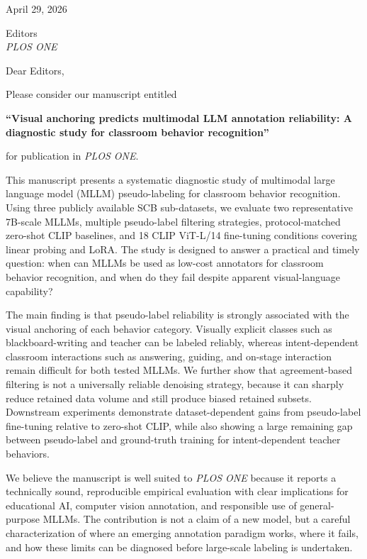 \documentclass[11pt]{article}
\begin{document}
\begin{flushright}
April 29, 2026
\end{flushright}

Editors \\
\textit{PLOS ONE}

Dear Editors,

Please consider our manuscript entitled

\textbf{``Visual anchoring predicts multimodal LLM annotation reliability: A diagnostic study for classroom behavior recognition''}

for publication in \textit{PLOS ONE}.

This manuscript presents a systematic diagnostic study of multimodal large
language model (MLLM) pseudo-labeling for classroom behavior recognition. Using
three publicly available SCB sub-datasets, we evaluate two representative
7B-scale MLLMs, multiple pseudo-label filtering strategies, protocol-matched
zero-shot CLIP baselines, and 18 CLIP ViT-L/14 fine-tuning conditions covering
linear probing and LoRA. The study is designed to answer a practical and timely
question: when can MLLMs be used as low-cost annotators for classroom behavior
recognition, and when do they fail despite apparent visual-language capability?

The main finding is that pseudo-label reliability is strongly associated with
the visual anchoring of each behavior category. Visually explicit classes such
as blackboard-writing and teacher can be labeled reliably, whereas
intent-dependent classroom interactions such as answering, guiding, and
on-stage interaction remain difficult for both tested MLLMs. We further show
that agreement-based filtering is not a universally reliable denoising strategy,
because it can sharply reduce retained data volume and still produce biased
retained subsets. Downstream experiments demonstrate dataset-dependent gains
from pseudo-label fine-tuning relative to zero-shot CLIP, while also showing a
large remaining gap between pseudo-label and ground-truth training for
intent-dependent teacher behaviors.

We believe the manuscript is well suited to \textit{PLOS ONE} because it reports
a technically sound, reproducible empirical evaluation with clear implications
for educational AI, computer vision annotation, and responsible use of
general-purpose MLLMs. The contribution is not a claim of a new model, but a
careful characterization of where an emerging annotation paradigm works, where
it fails, and how these limits can be diagnosed before large-scale labeling is
undertaken.
\end{document}
